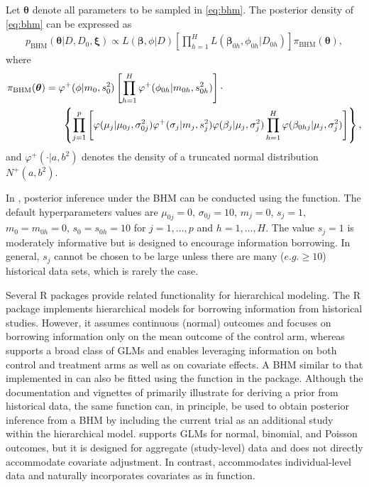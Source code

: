 Let $\bm{\theta}$ denote all parameters to be sampled in \eqref{eq:bhm}. The posterior density of \eqref{eq:bhm} can be expressed as
\begin{align}
    p_{\text{BHM}}(\bm{\theta} | D, D_0, \bm{\xi}) \propto
    L(\bm{\beta}, \phi | D)
    \left[
        \prod_{h=1}^H L(\bm{\beta}_{0h}, \phi_{0h} | D_{0h})
    \right]
    \pi_{\text{BHM}}(\bm{\theta})
    ,
    \label{eq:bhm_post}
\end{align}
where
\begin{align}
    \pi_{\text{BHM}}(\bm{\theta}) &=
    \varphi^+(\phi | m_0, s_0^2)
    \left[ \prod_{h=1}^H \varphi^+(\phi_{0h} | m_{0h}, s_{0h}^2) \right] \cdot \notag \\
    &~~~~~ \left\{
    \prod_{j=1}^p 
    \left[ \varphi(\mu_j | \mu_{0j}, \sigma_{0j}^2) \varphi^+(\sigma_j | m_j, s_j^2)
    \varphi(\beta_j | \mu_j, \sigma_j^2) \prod_{h=1}^H \varphi(\beta_{0hj} | \mu_j, \sigma_j^2)
    \right]
    \right\},
    \label{eq:bhm_prior}
\end{align}
and $\varphi^+(\cdot | a, b^2)$ denotes the density of a truncated normal distribution $N^{+}(a, b^2)$. 

In , posterior inference under the BHM can be conducted using the  function. The default hyperparameters values are $\mu_{0j} = 0$, $\sigma_{0j} = 10$, $m_j = 0$, $s_j = 1$, $m_0 = m_{0h} = 0$, $s_0 = s_{0h} = 10$ for $j = 1, \ldots, p$ and $h = 1, \ldots, H$. The value $s_j = 1$ is moderately informative but is designed to encourage information borrowing. In general, $s_j$ cannot be chosen to be large unless there are many ($e.g. \ge 10$) historical data sets, which is rarely the case. 

Several R packages provide related functionality for hierarchical modeling. The R package  implements hierarchical models for borrowing information from historical studies. However, it assumes continuous (normal) outcomes and focuses on borrowing information only on the mean outcome of the control arm, whereas  supports a broad class of GLMs and enables leveraging information on both control and treatment arms as well as on covariate effects. A BHM similar to that implemented in  can also be fitted using the  function in the  package. Although the documentation and vignettes of  primarily illustrate  for deriving a prior from historical data, the same function can, in principle, be used to obtain posterior inference from a BHM by including the current trial as an additional study within the hierarchical model.  supports GLMs for normal, binomial, and Poisson outcomes, but it is designed for aggregate (study-level) data and does not directly accommodate covariate adjustment. In contrast,  accommodates individual-level data and naturally incorporates covariates as in  function.

